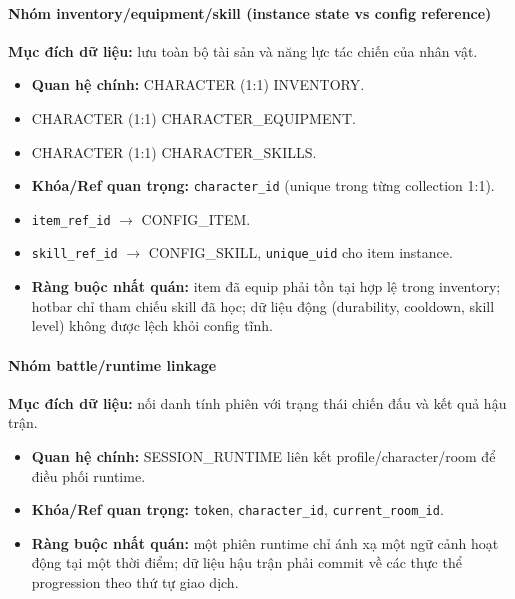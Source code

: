 \paragraph{Nhóm inventory/equipment/skill (instance state vs config reference)}
\textbf{Mục đích dữ liệu:} lưu toàn bộ tài sản và năng lực tác chiến của nhân vật.
\begin{itemize}
    \item \textbf{Quan hệ chính:} CHARACTER (1:1) INVENTORY.
    \item CHARACTER (1:1) CHARACTER\_\allowbreak EQUIPMENT.
    \item CHARACTER (1:1) CHARACTER\_\allowbreak SKILLS.
    \item \textbf{Khóa/\allowbreak Ref quan trọng:}
    \texttt{character\_id} (unique trong từng collection 1:1).
    \item \texttt{item\_ref\_id} $\rightarrow$ CONFIG\_ITEM.
    \item \texttt{skill\_ref\_id} $\rightarrow$ CONFIG\_SKILL, \texttt{unique\_uid} cho item instance.
    \item \textbf{Ràng buộc nhất quán:} item đã equip phải tồn tại hợp lệ trong inventory; hotbar chỉ tham chiếu skill đã học; dữ liệu động (durability, cooldown, skill level) không được lệch khỏi config tĩnh.
\end{itemize}

\paragraph{Nhóm battle/runtime linkage}
\textbf{Mục đích dữ liệu:} nối danh tính phiên với trạng thái chiến đấu và kết quả hậu trận.
\begin{itemize}
    \item \textbf{Quan hệ chính:} SESSION\_RUNTIME liên kết profile/\allowbreak character/\allowbreak room để điều phối runtime.
    \item \textbf{Khóa/\allowbreak Ref quan trọng:} \texttt{token}, \texttt{character\_id}, \texttt{current\_room\_id}.
    \item \textbf{Ràng buộc nhất quán:} một phiên runtime chỉ ánh xạ một ngữ cảnh hoạt động tại một thời điểm; dữ liệu hậu trận phải commit về các thực thể progression theo thứ tự giao dịch.
\end{itemize}


